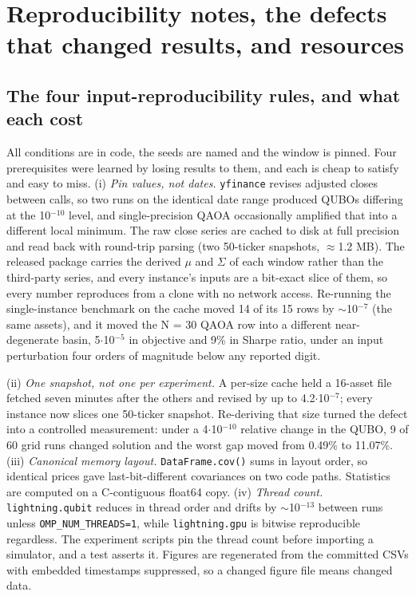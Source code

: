 \documentclass[journal]{IEEEtran}
\begin{document}
\section{Reproducibility notes, the defects that changed results, and resources}


\subsection{The four input-reproducibility rules, and what each cost}


All conditions are in code, the seeds are named and the window is pinned. Four prerequisites were learned by losing results to them, and each is cheap to satisfy and easy to miss. (i) \textit{Pin values, not dates.} \texttt{yfinance} revises adjusted closes between calls, so two runs on the identical date range produced QUBOs differing at the 10$^{-10}$ level, and single-precision QAOA occasionally amplified that into a different local minimum. The raw close series are cached to disk at full precision and read back with round-trip parsing (two 50-ticker snapshots, $\approx$1.2 MB). The released package carries the derived $\mu$ and $\Sigma$ of each window rather than the third-party series, and every instance's inputs are a bit-exact slice of them, so every number reproduces from a clone with no network access. Re-running the single-instance benchmark on the cache moved 14 of its 15 rows by $\sim$10$^{-7}$ (the same assets), and it moved the N = 30 QAOA row into a different near-degenerate basin, 5$\cdot$10$^{-5}$ in objective and 9\% in Sharpe ratio, under an input perturbation four orders of magnitude below any reported digit.


(ii) \textit{One snapshot, not one per experiment.} A per-size cache held a 16-asset file fetched seven minutes after the others and revised by up to 4.2$\cdot$10$^{-7}$; every instance now slices one 50-ticker snapshot. Re-deriving that size turned the defect into a controlled measurement: under a 4$\cdot$10$^{-10}$ relative change in the QUBO, 9 of 60 grid runs changed solution and the worst gap moved from 0.49\% to 11.07\%. (iii) \textit{Canonical memory layout.} \texttt{DataFrame.cov()} sums in layout order, so identical prices gave last-bit-different covariances on two code paths. Statistics are computed on a C-contiguous float64 copy. (iv) \textit{Thread count.} \texttt{lightning.qubit} reduces in thread order and drifts by $\sim$10$^{-13}$ between runs unless \texttt{OMP\_NUM\_THREADS=1}, while \texttt{lightning.gpu} is bitwise reproducible regardless. The experiment scripts pin the thread count before importing a simulator, and a test asserts it. Figures are regenerated from the committed CSVs with embedded timestamps suppressed, so a changed figure file means changed data.
\end{document}
